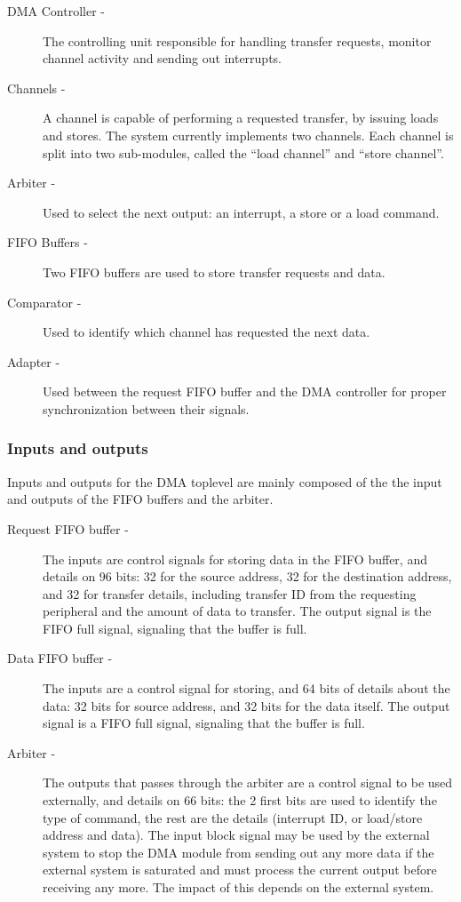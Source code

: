 \begin{appendix}
\begin{description}
    \item[DMA Controller -] 
    The controlling unit responsible for handling transfer requests, monitor channel activity and sending out interrupts.
    \item[Channels -] 
    A channel is capable of performing a requested transfer, by issuing loads and stores.
    The system currently implements two channels.
    Each channel is split into two sub-modules, called the ``load channel'' and ``store channel''.
    \item[Arbiter -]
    Used to select the next output: an interrupt, a store or a load command.     
    \item[FIFO Buffers -]
    Two FIFO buffers are used to store transfer requests and data.
    \item[Comparator -]
    Used to identify which channel has requested the next data.
    \item[Adapter -]
    Used between the request FIFO buffer and the DMA controller for proper synchronization between their signals.  
\end{description}

\subsubsection{Inputs and outputs}
Inputs and outputs for the DMA toplevel are mainly composed of the the input and outputs of the FIFO buffers and the arbiter.
\begin{description}
    \item[Request FIFO buffer -]
    The inputs are control signals for storing data in the FIFO buffer, and details on 96 bits: 32 for the source address, 32 for the destination address, and 32 for transfer details, including transfer ID from the requesting peripheral and the amount of data to transfer. 
    The output signal is the FIFO full signal, signaling that the buffer is full.
    \item[Data FIFO buffer -] 
    The inputs are a control signal for storing, and 64 bits of details about the data: 32 bits for source address, and 32 bits for the data itself.
    The output signal is a FIFO full signal, signaling that the buffer is full.
    \item[Arbiter -]
    The outputs that passes through the arbiter are a control signal to be used externally, and details on 66 bits: the 2 first bits are used to identify the type of command, the rest are the details (interrupt ID, or load/store address and data).
    The input block signal may be used by the external system to stop the DMA module from sending out any more data if the external system is saturated and must process the current output before receiving any more. 
    The impact of this depends on the external system.
\end{description}


\end{appendix}
